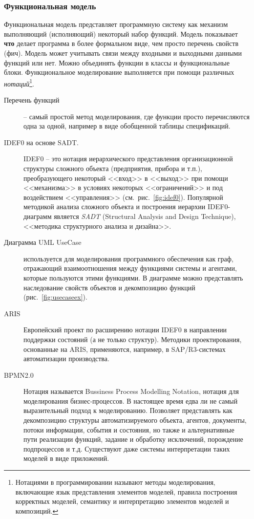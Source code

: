 \documentclass[a4paper,14pt,final]{extreport}
\begin{document}
\subsubsection{Функциональная модель}
\label{sec:funmod}

Функциональная модель представляет программную систему как механизм выполняющий (исполняющий) некоторый набор функций.  Модель показывает \textbf{что} делает программа в более формальном виде, чем просто перечень свойств (фич).   Модель может учитывать связи между входными и выходными данными функций или нет.  Можно объединять функции в классы и функциональные блоки.  Функциональное моделирование выполняется при помощи различных \emph{нотаций}\footnote{Нотациями в программировании называют методы моделирования, включающие язык представления элементов моделей, правила построения корректных моделей, семантику и интерпретацию элементов моделей и композиций.}.

\begin{description}
\item[Перечень функций] -- самый простой метод моделирования, где функции просто перечисляются одна за одной, например в виде обобщенной таблицы спецификаций.
\item[IDEF0 на основе SADT.]  IDEF0 -- это нотация иерархического представления организационной структуры сложного объекта (предприятия, прибора и т.п.), преобразующего некоторый <<вход>> в <<выход>> при помощи <<механизма>> в условиях некоторых <<ограничений>> и под воздействием <<управления>> (см.~рис.~\ref{fig:idef0}).  Популярной методикой анализа сложного объекта и построения иерархии IDEF0-диаграмм является \emph{SADT} (Structural Analysis and Design Technique), <<методика структурного анализа и дизайна>>.
\item[Диаграмма UML UseCase] используется для моделирования программного обеспечения как граф, отражающий взаимоотношения между функциями системы и агентами, которые пользуются этими функциями.  В диаграмме можно представлять наследование свойств объектов и декомпозицию функций (рис.~\ref{fig:usecaseex}).
\item[ARIS] Европейский проект по расширению нотации IDEF0 в направлении поддержки состояний (а не только структур).  Методики проектирования, основанные на ARIS, применяются, например, в SAP/R3-системах автоматизации производства.
\item[BPMN2.0] Нотация называется Bussiness Process Modelling Notation, нотация для моделирования бизнес-процессов.  В настоящее время едва ли не самый выразительный подход к моделированию.  Позволяет представлять как декомпозицию структуры автоматизируемого объекта, агентов, документы, потоки информации, события и состояния, но также и альтернативные пути реализации функций, задание и обработку исключений, порождение подпроцессов и т.д.  Существуют даже системы интерпретации таких моделей в виде приложений.
\end{description}
\end{document}
